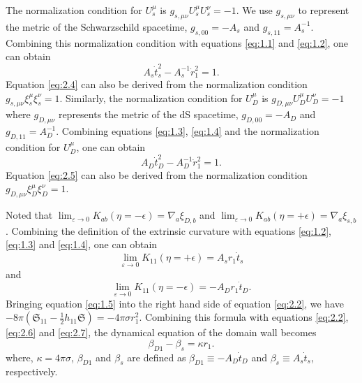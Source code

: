 \documentclass[12pt]{article}
\begin{document}
The normalization condition for $U_{s}^{\mu}$ is $g_{s,\mu\nu}U_{s}^{\mu}U_{s}^{\nu}=-1$. We use $g_{s,\mu\nu}$ to represent the metric of the Schwarzschild spacetime, $g_{s,00}=-A_{s}$ and $g_{s,11}=A_{s}^{-1}$. Combining this normalization condition with equations \eqref{eq:1.1} and \eqref{eq:1.2}, one can obtain~\cite{RJ}
\begin{equation}
\label{eq:2.4}%
A_{s}\dot{t}^{2}_{s}-A_{s}^{-1}\dot{r}_{1}^{2}=1.
\end{equation}
Equation \eqref{eq:2.4} can also be derived from the normalization condition $g_{s,\mu\nu}\xi_{ s}^{  \mu}\xi_{ s}^{  \nu}=1$. Similarly, the normalization condition for $U_{D}^{\mu}$ is $g_{D,\mu\nu}U_{D}^{\mu}U_{D}^{\nu}=-1$ where $g_{D,\mu\nu}$ represents the metric of the dS spacetime, $g_{D,00}=-A_{D}$ and $g_{D,11}=A_{D}^{-1}$. Combining equations \eqref{eq:1.3}, \eqref{eq:1.4} and the normalization condition for $U_{D}^{\mu}$, one can obtain
\begin{equation}
\label{eq:2.5}%
A_{D}\dot{t}^{2}_{D}-A_{D}^{-1}\dot{r}_{1}^{2}=1.
\end{equation}
Equation \eqref{eq:2.5} can also be derived from the normalization condition $g_{D,\mu\nu}\xi_{ D}^{  \mu}\xi_{ D}^{  \nu}=1$.

Noted that $\lim_{\varepsilon\rightarrow 0}K_{ab}(\eta=-\epsilon)=\nabla_{a}\xi_{ D,b}$ and $\lim_{\varepsilon\rightarrow 0}K_{ab}(\eta=+\epsilon)=\nabla_{a}\xi_{ s,b}$. Combining the definition of the extrinsic curvature with equations \eqref{eq:1.2}, \eqref{eq:1.3} and \eqref{eq:1.4}, one can obtain~\cite{RJ}
\begin{equation}
\label{eq:2.6}%
\lim_{\varepsilon\rightarrow 0}K_{11}(\eta=+\epsilon)=A_{s}r_{1}\dot{t}_{s}
\end{equation}
and
\begin{equation}
\label{eq:2.7}%
\lim_{\varepsilon\rightarrow 0}K_{11}(\eta=-\epsilon)=-A_{D}r_{1}\dot{t}_{D}.
\end{equation}
Bringing equation \eqref{eq:1.5} into the right hand side of equation \eqref{eq:2.2}, we have $-8\pi(\mathfrak{S}_{11}-\frac{1}{2}h_{11}\mathfrak{S})=-4\pi\sigma r_{1}^{2}$. Combining this formula with equations \eqref{eq:2.2}, \eqref{eq:2.6} and \eqref{eq:2.7}, the dynamical equation of the domain wall becomes~\cite{EAJ,SEA}
\begin{equation}
\label{eq:2.8}%
\beta_{D1}-\beta_{s}=\kappa r_{1}.
\end{equation}
where, $\kappa=4\pi\sigma$, $\beta_{D1}$ and $\beta_{s}$ are defined as $\beta_{D1}\equiv -A_{D}\dot{t}_{D}$ and $\beta_{s}\equiv A_{s}\dot{t}_{s}$, respectively.
\end{document}
